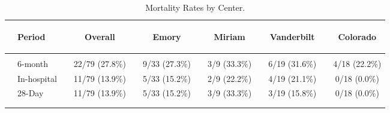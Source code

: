\documentclass[dvips,10pt]{article}
\begin{document}
\begin{table}[t]
\caption
{ Mortality Rates by Center. }
\begin{center}
\begin{tabular}{ @{}l@{}
@{}l@{}@{}p{1.5em}@{}@{}c@{}@{}p{1.5em}@{}@{}c@{}@{}p{1.5em}@{}@{}c@{}@{}p{1.5em}@{}@{}c@{}@{}p{1.5em}@{}@{}c@{}
}
\hline

& \parbox{6em}{\begin{center}Period\end{center}} && \parbox{6em}{\begin{center}Overall\end{center}} && \parbox{6em}{\begin{center}Emory\end{center}} && \parbox{6em}{\begin{center}Miriam\end{center}} && \parbox{6em}{\begin{center}Vanderbilt\end{center}} && \parbox{6em}{\begin{center}Colorado\end{center}} \\

\hline

\\
& 6-month && 22/79 (27.8\%) && 9/33 (27.3\%) && 3/9 (33.3\%) && 6/19 (31.6\%) && 4/18 (22.2\%) \\
& In-hospital && 11/79 (13.9\%) && 5/33 (15.2\%) && 2/9 (22.2\%) && 4/19 (21.1\%) && 0/18 (0.0\%) \\
& 28-Day && 11/79 (13.9\%) && 5/33 (15.2\%) && 3/9 (33.3\%) && 3/19 (15.8\%) && 0/18 (0.0\%) \\
\\
\hline \\

\end{tabular}

\end{center}
 \end{table}
\clearpage

\begin{figure}
\end{figure}
\clearpage

\begin{figure}
\end{figure}
\clearpage
\end{document}
